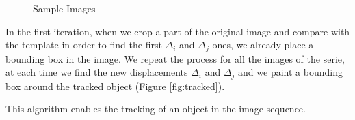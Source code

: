 \documentclass{article}
\begin{document}
\begin{figure}[H]
\centering
{}
		  \hspace{0.1cm}
		  \hspace{0.1cm}
\caption{Sample Images}
\label{fig:sample}
\end{figure}	

	In the first iteration, when we crop a part of the original image and compare with the template in order to find the first $\Delta_i$ and $\Delta_j$ ones, we already place a bounding box in the image. We repeat the process for all the images of the serie, at each time we find the new displacements $\Delta_i$ and $\Delta_j$ and we paint a bounding box around the tracked object (Figure \ref{fig:tracked}). 

	This algorithm enables the tracking of an object in the image sequence.
\end{document}
